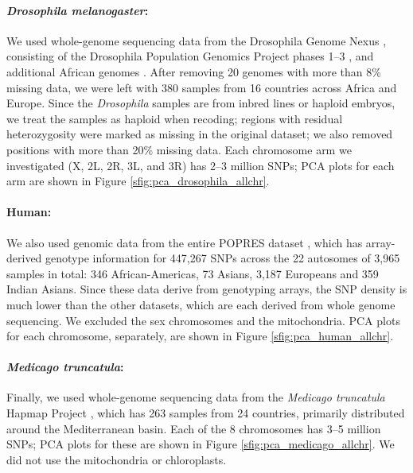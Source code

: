 \documentclass[11pt, oneside]{article}   	%
\begin{document}
\paragraph{\textit{Drosophila melanogaster}:}
We used whole-genome sequencing data 
from the Drosophila Genome Nexus \citep[\url{http://www.johnpool.net/genomes.html},][]{lack2015drosophila},
consisting of the Drosophila Population Genomics Project phases 1--3 \citep{langley2012genomic,pool2012population},
and additional African genomes \citep{lack2015drosophila}.
After removing 20 genomes with more than 8\% missing data,
we were left with 380 samples from 16 countries across Africa and Europe.
Since the \textit{Drosophila} samples are from inbred lines or haploid embryos, 
we treat the samples as haploid when recoding;
regions with residual heterozygosity were marked as missing in the original dataset;
we also removed positions with more than 20\% missing data. 
Each chromosome arm we investigated (X, 2L, 2R, 3L, and 3R) has 2--3 million SNPs;
PCA plots for each arm are shown in Figure \ref{sfig:pca_drosophila_allchr}.

\paragraph{Human:}
We also used genomic data from the entire POPRES dataset \citep{nelson2008population},
which has array-derived genotype information for 447,267 SNPs across the 22 autosomes
of 3,965 samples in total: 346 African-Americas, 73 Asians, 3,187 Europeans and 359 Indian Asians.
Since these data derive from genotyping arrays, the SNP density is much lower than the other datasets,
which are each derived from whole genome sequencing.
We excluded the sex chromosomes and the mitochondria.
PCA plots for each chromosome, separately, are shown in Figure \ref{sfig:pca_human_allchr}.


\paragraph{\textit{Medicago truncatula}:}
Finally, we used whole-genome sequencing data from the \textit{Medicago truncatula} Hapmap Project \citep{tang2014improved},
which has 263 samples from 24 countries,
primarily distributed around the Mediterranean basin.
Each of the 8 chromosomes has 3--5 million SNPs;
PCA plots for these are shown in Figure \ref{sfig:pca_medicago_allchr}.
We did not use the mitochondria or chloroplasts.
\end{document}
